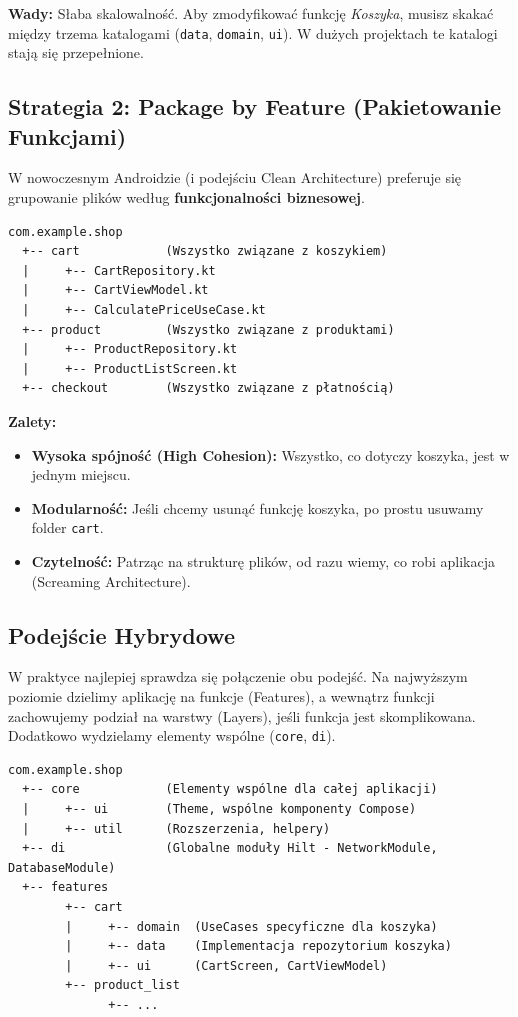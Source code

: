 \textbf{Wady:} Słaba skalowalność. Aby zmodyfikować funkcję \textit{Koszyka}, musisz skakać między trzema katalogami (\texttt{data}, \texttt{domain}, \texttt{ui}). W dużych projektach te katalogi stają się przepełnione.

\subsection{Strategia 2: Package by Feature (Pakietowanie Funkcjami)}

W nowoczesnym Androidzie (i podejściu Clean Architecture) preferuje się grupowanie plików według \textbf{funkcjonalności biznesowej}.

\begin{verbatim}
com.example.shop
  +-- cart            (Wszystko związane z koszykiem)
  |     +-- CartRepository.kt
  |     +-- CartViewModel.kt
  |     +-- CalculatePriceUseCase.kt
  +-- product         (Wszystko związane z produktami)
  |     +-- ProductRepository.kt
  |     +-- ProductListScreen.kt
  +-- checkout        (Wszystko związane z płatnością)
\end{verbatim}

\textbf{Zalety:}
\begin{itemize}
    \item \textbf{Wysoka spójność (High Cohesion):} Wszystko, co dotyczy koszyka, jest w jednym miejscu.
    \item \textbf{Modularność:} Jeśli chcemy usunąć funkcję koszyka, po prostu usuwamy folder \texttt{cart}.
    \item \textbf{Czytelność:} Patrząc na strukturę plików, od razu wiemy, co robi aplikacja (Screaming Architecture).
\end{itemize}


\subsection{Podejście Hybrydowe}

W praktyce najlepiej sprawdza się połączenie obu podejść. Na najwyższym poziomie dzielimy aplikację na funkcje (Features), a wewnątrz funkcji zachowujemy podział na warstwy (Layers), jeśli funkcja jest skomplikowana. Dodatkowo wydzielamy elementy wspólne (\texttt{core}, \texttt{di}).

\begin{verbatim}
com.example.shop
  +-- core            (Elementy wspólne dla całej aplikacji)
  |     +-- ui        (Theme, wspólne komponenty Compose)
  |     +-- util      (Rozszerzenia, helpery)
  +-- di              (Globalne moduły Hilt - NetworkModule, DatabaseModule)
  +-- features
        +-- cart
        |     +-- domain  (UseCases specyficzne dla koszyka)
        |     +-- data    (Implementacja repozytorium koszyka)
        |     +-- ui      (CartScreen, CartViewModel)
        +-- product_list
              +-- ...
\end{verbatim}

